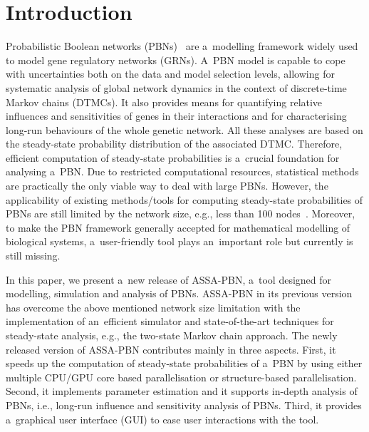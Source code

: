 \documentclass[runningheads,a4paper]{llncs}
\begin{document}
\section{Introduction}
\label{sec:intro}
Probabilistic Boolean networks (PBNs)~\cite{SDZ02,TMPTSS13}
are a~modelling framework widely used to model gene regulatory networks (GRNs).
A~PBN model is capable to cope with uncertainties both on the data and model selection levels,
allowing for systematic analysis of global network dynamics in the context of discrete-time Markov chains (DTMCs).
It also provides means for quantifying relative influences and sensitivities of genes in their interactions and for
characterising long-run behaviours of the whole genetic network.
All these analyses are based on the steady-state probability distribution of the associated DTMC.
Therefore, efficient computation of steady-state probabilities is a~crucial foundation for analysing a~PBN.
Due to restricted computational resources,
statistical methods are practically the only viable way to deal with large PBNs.
However, the applicability of existing methods/tools for computing steady-state probabilities of PBNs
are still limited by the network size, e.g., less than 100 nodes~\cite{PAJ14}.
Moreover, to make
the PBN framework generally accepted for mathematical modelling of biological systems,
a~user-friendly tool plays an~important role but currently is still missing.

In this paper, we present a~new release of {\sf ASSA-PBN},
a~tool designed for modelling, simulation and analysis of PBNs.
{\sf ASSA-PBN} in its previous version~\cite{assa} has overcome
the above mentioned network size limitation with the implementation of an~efficient simulator
and state-of-the-art techniques for steady-state analysis, e.g., the two-state Markov chain
approach. The newly released version of {\sf ASSA-PBN} contributes mainly in three aspects.
First, it speeds up the computation of steady-state probabilities of a~PBN by using either
multiple CPU/GPU core based parallelisation or structure-based parallelisation. Second, it
implements parameter estimation and it supports in-depth analysis of PBNs, i.e., long-run
influence and sensitivity analysis of PBNs. Third, it provides a~graphical user interface (GUI) to
ease user interactions with the tool.
\end{document}
